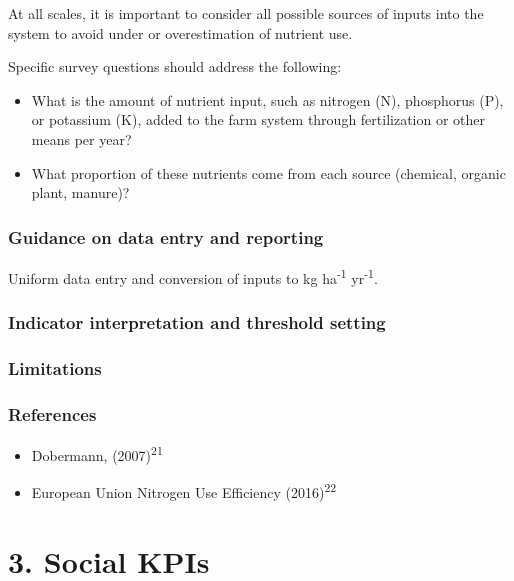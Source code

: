\documentclass[
  letterpaper,
  DIV=11,
  numbers=noendperiod]{scrreprt}
\providecommand{\tightlist}{%
  \setlength{\itemsep}{0pt}\setlength{\parskip}{0pt}}
\begin{document}
At all scales, it is important to consider all possible sources of
inputs into the system to avoid under or overestimation of nutrient use.

Specific survey questions should address the following:

\begin{itemize}
\tightlist
\item
  What is the amount of nutrient input, such as nitrogen (N), phosphorus
  (P), or potassium (K), added to the farm system through fertilization
  or other means per year?
\item
  What proportion of these nutrients come from each source (chemical,
  organic plant, manure)?
\end{itemize}

\section{Guidance on data entry and
reporting}\label{guidance-on-data-entry-and-reporting-3}

Uniform data entry and conversion of inputs to kg ha\textsuperscript{-1}
yr\textsuperscript{-1}.

\section{Indicator interpretation and threshold
setting}\label{indicator-interpretation-and-threshold-setting-3}

\section{Limitations}\label{limitations-3}

\section{References}\label{references-3}

\begin{itemize}
\tightlist
\item
  Dobermann, (2007)\textsuperscript{21}
\item
  European Union Nitrogen Use Efficiency (2016)\textsuperscript{22}
\end{itemize}

\part{3. Social KPIs}
\end{document}
